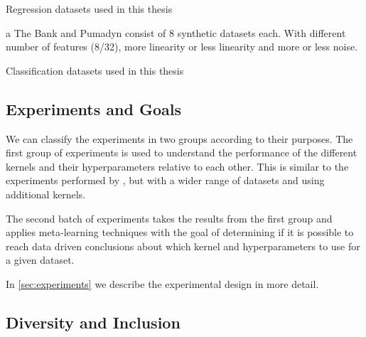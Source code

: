 \begin{table}[H]
    \begin{threeparttable}
        \caption{Regression datasets used in this thesis}
        \label{tab:datasets_regression}
        
        \begin{tablenotes}
            \item[a] The Bank and Pumadyn consist of 8 synthetic datasets each. With different
            number of features (8/32), more linearity or less linearity and more or less noise.
        \end{tablenotes}
    \end{threeparttable}
\end{table}

\begin{table}[H]
    \caption{Classification datasets used in this thesis}
    \label{tab:datasets_classification}
    
\end{table}

\subsection{Experiments and Goals}%

We can classify the experiments in two groups according to their purposes. The
first group of experiments is used to understand the performance of the
different kernels and their hyperparameters relative to each other. This is
similar to the experiments performed by
\textcite{frenayParameterinsensitiveKernelExtreme2011}, but with a wider range
of datasets and using additional kernels.

The second batch of experiments takes the results from the first group and
applies meta-learning techniques with the goal of determining if it is possible
to reach data driven conclusions about which kernel and hyperparameters to use
for a given dataset.

In \cref{sec:experiments} we describe the experimental design in more detail.

%

\subsection{Diversity and Inclusion}%

